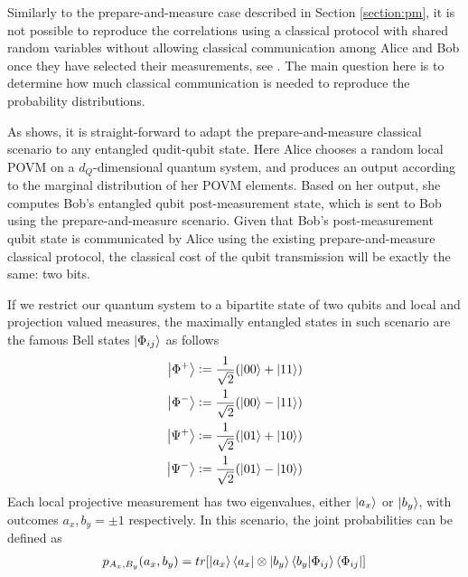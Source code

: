 Similarly to the prepare-and-measure case described in Section \ref{section:pm}, it is not possible to reproduce the correlations using a classical protocol with shared random variables without allowing classical communication among Alice and Bob once they have selected their measurements, see \cite{bell1964}. The main question here is to determine how much classical communication is needed to reproduce the probability distributions.

As \cite{renner2023} shows, it is straight-forward to adapt the prepare-and-measure classical scenario to any entangled qudit-qubit state. Here Alice chooses a random local POVM on a $d_Q$-dimensional quantum system, and produces an output according to the marginal distribution of her POVM elements. Based on her output, she computes Bob's entangled qubit post-measurement state, which is sent to Bob using the prepare-and-measure scenario. Given that Bob's post-measurement qubit state is communicated by Alice using the existing prepare-and-measure classical protocol, the classical cost of the qubit transmission will be exactly the same: two bits. 

If we restrict our quantum system to a bipartite state of two qubits and local and projection valued measures, the maximally entangled states in such scenario are the famous Bell states $\ket{\Phi_{ij}}$ as follows
\begin{equation}\label{eq:bell_states}
\begin{split}
\ket{\Phi^{+}} \vcentcolon= \frac{1}{\sqrt{2}}(\ket{00} + \ket{11})\\
\ket{\Phi^{-}} \vcentcolon= \frac{1}{\sqrt{2}}(\ket{00} - \ket{11})\\
\ket{\Psi^{+}} \vcentcolon= \frac{1}{\sqrt{2}}(\ket{01} + \ket{10})\\
\ket{\Psi^{-}} \vcentcolon= \frac{1}{\sqrt{2}}(\ket{01} - \ket{10})
\end{split}
\end{equation}
Each local projective measurement has two eigenvalues, either $\ket{a_{x}}$ or $\ket{b_{y}}$, with outcomes $a_{x}, b_{y}=\pm1$ respectively. In this scenario, the joint probabilities can be defined as
\begin{equation}\label{eq:prob_quantum_bell}
\begin{split}
p_{A_x,B_y}(a_x, b_y) = tr[\ket{a_{x}}\bra{a_{x}} \otimes \ket{b_{y}}\bra{b_{y}} \ket{\Phi_{ij}} \bra{\Phi_{ij}}]\\
\end{split}
\end{equation}

